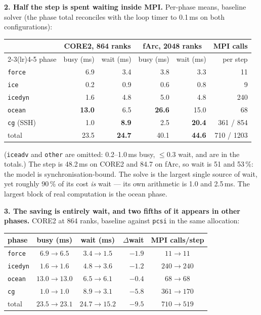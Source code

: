 \documentclass[10pt,a4paper]{article}
\begin{document}
\textbf{2. Half the step is spent waiting inside MPI.} Per-phase means, baseline solver
(the phase total reconciles with the loop timer to 0.1\,ms on both configurations):

\begin{center}\vspace{-5pt}\footnotesize
\begin{tabular}{lrrrrr}
\toprule
& \multicolumn{2}{c}{CORE2, 864 ranks} & \multicolumn{2}{c}{fArc, 2048 ranks} & MPI calls \\
\cmidrule(lr){2-3}\cmidrule(lr){4-5}
phase & busy (ms) & wait (ms) & busy (ms) & wait (ms) & per step \\
\midrule
\texttt{force}   &  6.9 &  3.4 &  3.8 &  3.3 & 11 \\
\texttt{ice}     &  0.2 &  0.9 &  0.6 &  0.8 & 9 \\
\texttt{icedyn}  &  1.6 &  4.8 &  5.0 &  4.8 & 240 \\
\texttt{ocean}   & \textbf{13.0} &  6.5 & \textbf{26.6} & 15.0 & 68 \\
\texttt{cg} (SSH)&  1.0 & \textbf{8.9} &  2.5 & \textbf{20.4} & 361 / 854 \\
\midrule
total & 23.5 & \textbf{24.7} & 40.1 & \textbf{44.6} & 710 / 1203 \\
\bottomrule
\end{tabular}\vspace{-5pt}
\end{center}

\noindent
(\texttt{iceadv} and \texttt{other} are omitted: 0.2--1.0\,ms busy, $\le$0.3 wait, and are in
the totals.) The step is 48.2\,ms on CORE2 and 84.7 on fArc, so wait is 51 and 53\,\%: the model is
synchronisation-bound. The solve is the largest single source of wait, yet roughly 90\,\% of
its cost \emph{is} wait --- its own arithmetic is 1.0 and 2.5\,ms. The largest block of real
computation is the ocean phase.

\textbf{3. The saving is entirely wait, and two fifths of it appears in other phases.}
CORE2 at 864 ranks, baseline against \texttt{pcsi} in the same allocation:

\begin{center}\vspace{-5pt}\footnotesize
\begin{tabular}{lccrc}
\toprule
phase & busy (ms) & wait (ms) & $\Delta$wait & MPI calls/step \\
\midrule
\texttt{force}  & $6.9\to6.5$ & $3.4\to1.5$ & $-1.9$ & $11\to11$ \\
\texttt{icedyn} & $1.6\to1.6$ & $4.8\to3.6$ & $-1.2$ & $240\to240$ \\
\texttt{ocean}  & $13.0\to13.0$ & $6.5\to6.1$ & $-0.4$ & $68\to68$ \\
\texttt{cg}     & $1.0\to1.0$ & $8.9\to3.1$ & $-5.8$ & $361\to170$ \\
\midrule
total & $\mathbf{23.5\to23.1}$ & $\mathbf{24.7\to15.2}$ & $\mathbf{-9.5}$ & $710\to519$ \\
\bottomrule
\end{tabular}\vspace{-5pt}
\end{center}
\end{document}
